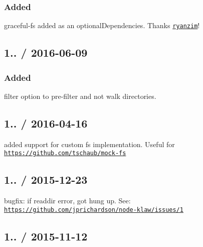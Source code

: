 \subsubsection*{Added}


\begin{DoxyItemize}
\item {\ttfamily graceful-\/fs} added as an {\ttfamily optional\+Dependencies}. Thanks \href{https://github.com/ryanzim}{\tt ryanzim}!
\end{DoxyItemize}

\subsection*{1.. / 2016-\/06-\/09 }

\subsubsection*{Added}


\begin{DoxyItemize}
\item {\ttfamily filter} option to pre-\/filter and not walk directories.
\end{DoxyItemize}

\subsection*{1.. / 2016-\/04-\/16 }


\begin{DoxyItemize}
\item added support for custom {\ttfamily fs} implementation. Useful for \href{https://github.com/tschaub/mock-fs}{\tt https\+://github.\+com/tschaub/mock-\/fs}
\end{DoxyItemize}

\subsection*{1.. / 2015-\/12-\/23 }


\begin{DoxyItemize}
\item bugfix\+: if {\ttfamily readdir} error, got hung up. See\+: \href{https://github.com/jprichardson/node-klaw/issues/1}{\tt https\+://github.\+com/jprichardson/node-\/klaw/issues/1}
\end{DoxyItemize}

\subsection*{1.. / 2015-\/11-\/12 }


